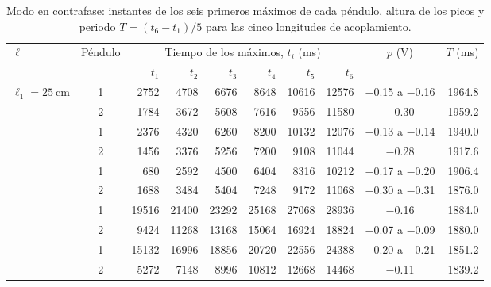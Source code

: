 
\begin{table}[ht]
\centering
\caption{Modo en contrafase: instantes de los seis primeros máximos de cada péndulo, altura de los picos y periodo $T=(t_6-t_1)/5$ para las cinco longitudes de acoplamiento.}
\label{tab:modo2}
\renewcommand{\arraystretch}{1.18}\setlength{\tabcolsep}{4.2pt}
\begin{tabular}{@{}l c *{6}{r} c r@{}}
\toprule
$\ell$ & Péndulo & \multicolumn{6}{c}{Tiempo de los máximos, $t_{i}$ (\si{\milli\second})} & $p$ (\si{\volt}) & $T$ (\si{\milli\second}) \\
\cmidrule(lr){3-8}
 & & $t_1$ & $t_2$ & $t_3$ & $t_4$ & $t_5$ & $t_6$ & & \\
\midrule
\multirow{2}{*}{$\ell_{1}=\SI{25}{\centi\meter}$} & 1 & \num{2752} & \num{4708} & \num{6676} & \num{8648} & \num{10616} & \num{12576} & $-$0.15 a $-$0.16 & \num{1964.8} \\
 & 2 & \num{1784} & \num{3672} & \num{5608} & \num{7616} & \num{9556} & \num{11580} & $-$0.30 & \num{1959.2} \\
\addlinespace[2pt]
\multirow{2}{*}{$\ell_{2}=\SI{35}{\centi\meter}$} & 1 & \num{2376} & \num{4320} & \num{6260} & \num{8200} & \num{10132} & \num{12076} & $-$0.13 a $-$0.14 & \num{1940.0} \\
 & 2 & \num{1456} & \num{3376} & \num{5256} & \num{7200} & \num{9108} & \num{11044} & $-$0.28 & \num{1917.6} \\
\addlinespace[2pt]
\multirow{2}{*}{$\ell_{3}=\SI{45}{\centi\meter}$} & 1 & \num{680} & \num{2592} & \num{4500} & \num{6404} & \num{8316} & \num{10212} & $-$0.17 a $-$0.20 & \num{1906.4} \\
 & 2 & \num{1688} & \num{3484} & \num{5404} & \num{7248} & \num{9172} & \num{11068} & $-$0.30 a $-$0.31 & \num{1876.0} \\
\addlinespace[2pt]
\multirow{2}{*}{$\ell_{4}=\SI{55}{\centi\meter}$} & 1 & \num{19516} & \num{21400} & \num{23292} & \num{25168} & \num{27068} & \num{28936} & $-$0.16 & \num{1884.0} \\
 & 2 & \num{9424} & \num{11268} & \num{13168} & \num{15064} & \num{16924} & \num{18824} & $-$0.07 a $-$0.09 & \num{1880.0} \\
\addlinespace[2pt]
\multirow{2}{*}{$\ell_{5}=\SI{65}{\centi\meter}$} & 1 & \num{15132} & \num{16996} & \num{18856} & \num{20720} & \num{22556} & \num{24388} & $-$0.20 a $-$0.21 & \num{1851.2} \\
 & 2 & \num{5272} & \num{7148} & \num{8996} & \num{10812} & \num{12668} & \num{14468} & $-$0.11 & \num{1839.2} \\
\bottomrule
\end{tabular}
\end{table}

